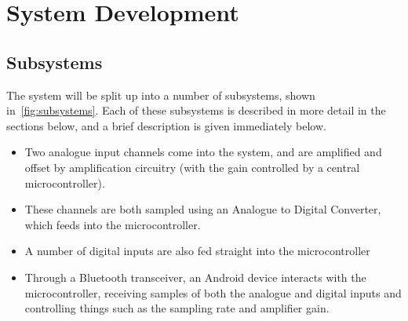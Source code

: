 \chapter{System Development}
\section{Subsystems}

The system will be split up into a number of subsystems, shown
in~\cref{fig:subsystems}. Each of these subsystems is described in more detail
in the sections below, and a brief description is given immediately below.

\begin{itemize}

  \item Two analogue input channels come into the system, and are amplified and
  offset by amplification circuitry (with the gain controlled by a central
  microcontroller).

  \item These channels are both sampled using an Analogue to Digital Converter,
  which feeds into the microcontroller.

  \item A number of digital inputs are also fed straight into the
  microcontroller

  \item Through a Bluetooth transceiver, an Android device interacts with the
  microcontroller, receiving samples of both the analogue and digital inputs and
  controlling things such as the sampling rate and amplifier gain.

\end{itemize}

